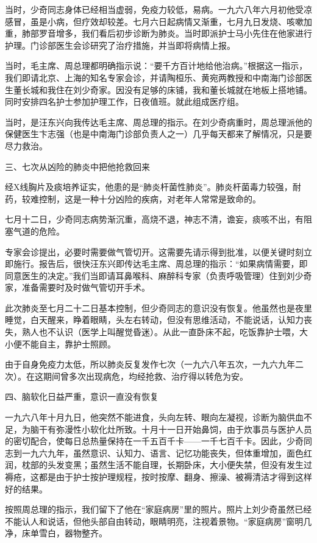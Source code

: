 \begin{maonote}
当时，少奇同志身体已经相当虚弱，免疫力较低，易病。一九六八年六月初他受凉感冒，虽是小病，但疗效却较差。七月六日起病情又渐重，七月九日发烧、咳嗽加重，肺部罗音增多，我们看后初步诊断为肺炎。当时即派护士马小先住在他家进行护理。门诊部医生会诊研究了治疗措施，并当即将病情上报。

当时，毛主席、周总理都明确指示说：“要千方百计地给他治病。”根据这一指示，我们即请北京、上海的知名专家会诊，并请陶桓乐、黄宛两教授和中南海门诊部医生董长城和我住在刘少奇家。因没有足够的床铺，我和董长城就在地板上搭地铺。同时安排四名护士参加护理工作，日夜值班。就此组成医疗组。

当时，是汪东兴向我传达毛主席、周总理的指示。在刘少奇病重时，周总理派他的保健医生卞志强（也是中南海门诊部负责人之一）几乎每天都来了解情况，只是要尽力救治。

三、七次从凶险的肺炎中把他抢救回来

经X线胸片及痰培养证实，他患的是“肺炎杆菌性肺炎”。肺炎杆菌毒力较强，耐药，较难控制，这是一种十分凶险的疾病，对老年人常常是致命的。

七月十二日，少奇同志病势渐沉重，高烧不退，神志不清，谵妄，痰咳不出，有阻塞气道的危险。

专家会诊提出，必要时需要做气管切开。这需要先请示得到批准，以便关键时刻立即施行。报告后，很快汪东兴即传达毛主席、周总理的指示：“如果病情需要，即同意医生的决定。”我们当即请耳鼻喉科、麻醉科专家（负责呼吸管理）住到刘少奇家，准备需要时及时做气管切开手术。

此次肺炎至七月二十二日基本控制，但少奇同志的意识没有恢复。他虽然也是夜里睡觉，白天醒来，睁着眼睛，头左右转动，但没有思维活动，不能说话，认知力丧失，熟人也不认识（医学上叫醒觉昏迷）。从此一直卧床不起，吃饭靠护士喂，大小便不能自主，靠护士照顾。

由于自身免疫力太低，所以肺炎反复发作七次（一九六八年五次，一九六九年二次）。在这期间曾多次出现病危，均经抢救、治疗得以转危为安。

四、脑软化日益严重，意识一直没有恢复

一九六八年十月九日，他突然不能进食，头向左转、眼向左凝视，诊断为脑供血不足，为脑干有弥漫性小软化灶所致。十月十一日开始鼻饲，由于炊事员与医护人员的密切配合，使每日总热量保持在一千五百千卡——一千七百千卡。因此，少奇同志到一九六九年，虽然意识、认知力、语言、记忆功能丧失，但体重增加，面色红润，枕部的头发变黑；虽然生活不能自理，长期卧床，大小便失禁，但没有发生过褥疮，这都是由于护士按护理规程，按时按摩、翻身、擦澡、被褥清洁才得到这样好的结果。

按照周总理的指示，我们留下了他在“家庭病房”里的照片。照片上刘少奇虽然已经不能认人和说话，但他头部自由转动，眼睛明亮，注视着景物。“家庭病房”窗明几净，床单雪白，器物整齐。


\end{maonote}
